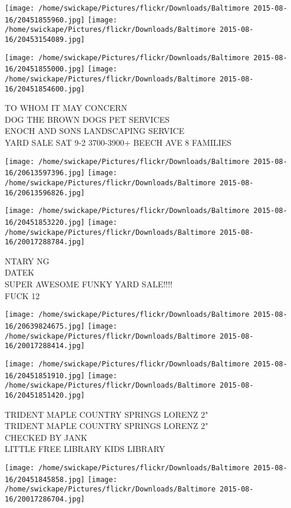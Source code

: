 \documentclass[10pt,letterpaper]{article}
\begin{document}
\texttt{[image: /home/swickape/Pictures/flickr/Downloads/Baltimore 2015-08-16/20451855960.jpg]}
\texttt{[image: /home/swickape/Pictures/flickr/Downloads/Baltimore 2015-08-16/20453154089.jpg]}

\texttt{[image: /home/swickape/Pictures/flickr/Downloads/Baltimore 2015-08-16/20451855000.jpg]}
\texttt{[image: /home/swickape/Pictures/flickr/Downloads/Baltimore 2015-08-16/20451854600.jpg]}

TO WHOM IT MAY CONCERN\\
DOG THE BROWN DOGS PET SERVICES\\
ENOCH AND SONS LANDSCAPING SERVICE\\
YARD SALE SAT 9{-}2 3700{-}3900+ BEECH AVE 8 FAMILIES
\pagebreak

\texttt{[image: /home/swickape/Pictures/flickr/Downloads/Baltimore 2015-08-16/20613597396.jpg]}
\texttt{[image: /home/swickape/Pictures/flickr/Downloads/Baltimore 2015-08-16/20613596826.jpg]}

\texttt{[image: /home/swickape/Pictures/flickr/Downloads/Baltimore 2015-08-16/20451853220.jpg]}
\texttt{[image: /home/swickape/Pictures/flickr/Downloads/Baltimore 2015-08-16/20017288784.jpg]}

NTARY NG\\
DATEK\\
SUPER AWESOME FUNKY YARD SALE!!!!\\
FUCK 12
\pagebreak

\texttt{[image: /home/swickape/Pictures/flickr/Downloads/Baltimore 2015-08-16/20639824675.jpg]}
\texttt{[image: /home/swickape/Pictures/flickr/Downloads/Baltimore 2015-08-16/20017288414.jpg]}

\texttt{[image: /home/swickape/Pictures/flickr/Downloads/Baltimore 2015-08-16/20451851910.jpg]}
\texttt{[image: /home/swickape/Pictures/flickr/Downloads/Baltimore 2015-08-16/20451851420.jpg]}

TRIDENT MAPLE COUNTRY SPRINGS LORENZ 2"\\
TRIDENT MAPLE COUNTRY SPRINGS LORENZ 2"\\
CHECKED BY JANK\\
LITTLE FREE LIBRARY KIDS LIBRARY
\pagebreak

\texttt{[image: /home/swickape/Pictures/flickr/Downloads/Baltimore 2015-08-16/20451845858.jpg]}
\texttt{[image: /home/swickape/Pictures/flickr/Downloads/Baltimore 2015-08-16/20017286704.jpg]}
\end{document}
